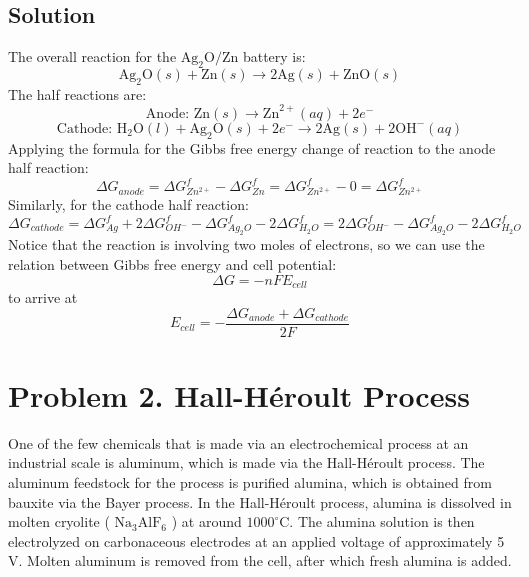 \documentclass[12pt]{article}
\begin{document}
\subsection{Solution}
The overall reaction for the $\mathrm{Ag}_{2} \mathrm{O} / \mathrm{Zn}$ battery is:
\begin{equation}
\mathrm{Ag}_{2} \mathrm{O}(s)+\mathrm{Zn}(s) \rightarrow 2 \mathrm{Ag}(s)+\mathrm{ZnO}(s)
\end{equation}
The half reactions are:
\begin{equation}
\text{Anode: } \mathrm{Zn}(s) \rightarrow \mathrm{Zn}^{2+}(aq)+2 e^{-}
\end{equation}
\begin{equation}
\text{Cathode: } \mathrm{H_2O}(l)+\mathrm{Ag}_{2} \mathrm{O}(s)+2 e^{-} \rightarrow 2 \mathrm{Ag}(s)+2\mathrm{OH}^{-}(aq)
\end{equation}
Applying the formula for the Gibbs free energy change of reaction to the anode half reaction:
\begin{equation}
\Delta G_{anode} = \Delta G_{Zn^{2+}}^{f} - \Delta G_{Zn}^{f} = \Delta G_{Zn^{2+}}^{f} - 0 = \Delta G_{Zn^{2+}}^{f}
\end{equation}
Similarly, for the cathode half reaction:
\begin{equation}
\Delta G_{cathode} = \Delta G_{Ag}^{f} + 2\Delta G_{OH^{-}}^{f} - \Delta G_{Ag_{2}O}^{f} - 2\Delta G_{H_{2}O}^{f} = 2\Delta G_{OH^{-}}^{f} - \Delta G_{Ag_{2}O}^{f} - 2\Delta G_{H_{2}O}^{f}
\end{equation}
 Notice that the reaction is involving two moles of electrons, so we can use the relation between Gibbs free energy and cell potential:
\begin{equation}
\Delta G = -nFE_{cell}
\end{equation}
to arrive at 
\begin{equation}
E_{cell} = -\frac{\Delta G_{anode} + \Delta G_{cathode}}{2F}
\end{equation}

\section{Problem 2. Hall-Héroult Process}
One of the few chemicals that is made via an electrochemical process at an industrial scale is aluminum, which is made via the Hall-Héroult process. The aluminum feedstock for the process is purified alumina, which is obtained from bauxite via the Bayer process. In the Hall-Héroult process, alumina is dissolved in molten cryolite ( $\mathrm{Na}_{3} \mathrm{AlF}_{6}$ ) at around $1000^{\circ} \mathrm{C}$. The alumina solution is then electrolyzed on carbonaceous electrodes at an applied voltage of approximately 5 V. Molten aluminum is removed from the cell, after which fresh alumina is added.
\end{document}
